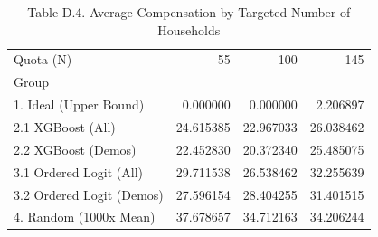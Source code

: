\begin{table}
\caption{Table D.4. Average Compensation by Targeted Number of Households}
\begin{tabular}{lrrr}
\toprule
Quota (N) & 55 & 100 & 145 \\
Group &  &  &  \\
\midrule
1. Ideal (Upper Bound) & 0.000000 & 0.000000 & 2.206897 \\
2.1 XGBoost (All) & 24.615385 & 22.967033 & 26.038462 \\
2.2 XGBoost (Demos) & 22.452830 & 20.372340 & 25.485075 \\
3.1 Ordered Logit (All) & 29.711538 & 26.538462 & 32.255639 \\
3.2 Ordered Logit (Demos) & 27.596154 & 28.404255 & 31.401515 \\
4. Random (1000x Mean) & 37.678657 & 34.712163 & 34.206244 \\
\bottomrule
\end{tabular}
\end{table}
